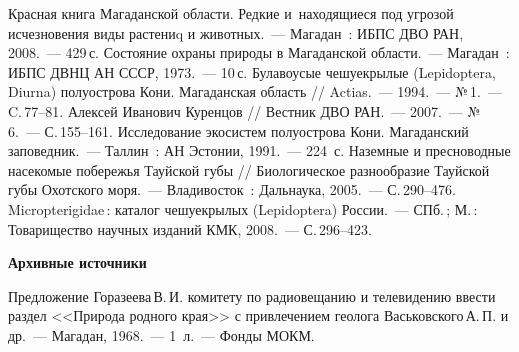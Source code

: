 \begin{thebibliography}{99}

\bibitem{} Красная книга Магаданской области. Редкие и~находящиеся под угрозой исчезновения виды растениq и животных.~--- Магадан~: ИБПС ДВО РАН, 2008.~--- 429\,с.
\bibitem{} Состояние охраны природы в Магаданской области.~--- Магадан~: ИБПС ДВНЦ АН СССР, 1973.~--- 10\,с.
\bibitem{} Булавоусые чешуекрылые (Lepidoptera, Diurna) полуострова Кони. Магаданская область // Actias.~--- 1994.~--- №\,1.~--- C.\,77--81.
\bibitem{} Алексей Иванович Куренцов // Вестник ДВО РАН.~--- 2007.~--- №\,6.~--- С.\,155--161.
\bibitem{} Исследование экосистем полуострова Кони. Магаданский заповедник.~--- Таллин~: АН Эстонии, 1991.~--- 224~с.
\bibitem{} Наземные и пресноводные насекомые побережья Тауйской губы // Биологическое разнообразие Тауйской губы Охотского моря.~--- Владивосток~: Дальнаука, 2005.~--- С.\,290--476.
\bibitem{} Micropterigidae\,: каталог чешуекрылых (Lepidoptera) России.~--- СПб.\,; М.\,: Товарищество научных изданий КМК, 2008.~--- С.\,296--423.

\textbf{Архивные источники}

\bibitem{}Предложение Горазеева\,В.\,И. комитету по радиовещанию и телевидению ввести раздел <<Природа родного края>> с привлечением геолога Васьковского\,А.\,П. и др.~--- Магадан, 1968.~--- 1~л.~--- Фонды МОКМ.
\end{thebibliography}
